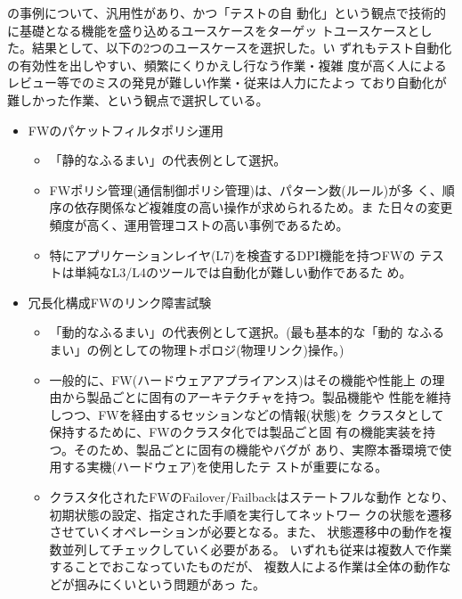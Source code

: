 の事例について、汎用性があり、かつ「テストの自
動化」という観点で技術的に基礎となる機能を盛り込めるユースケースをターゲッ
トユースケースとした。結果として、以下の2つのユースケースを選択した。い
ずれもテスト自動化の有効性を出しやすい、頻繁にくりかえし行なう作業・複雑
度が高く人によるレビュー等でのミスの発見が難しい作業・従来は人力にたよっ
ており自動化が難しかった作業、という観点で選択している。
\begin{itemize}
 \item FWのパケットフィルタポリシ運用
       \begin{itemize}
        \item 「静的なふるまい」の代表例として選択。
        \item FWポリシ管理(通信制御ポリシ管理)は、パターン数(ルール)が多
              く、順序の依存関係など複雑度の高い操作が求められるため。ま
              た日々の変更頻度が高く、運用管理コストの高い事例であるため。
        \item 特にアプリケーションレイヤ(L7)を検査するDPI機能を持つFWの
              テストは単純なL3/L4のツールでは自動化が難しい動作であるた
              め。
       \end{itemize}
 \item 冗長化構成FWのリンク障害試験
       \begin{itemize}
        \item 「動的なふるまい」の代表例として選択。(最も基本的な「動的
              なふるまい」の例としての物理トポロジ(物理リンク)操作。)
        \item 一般的に、FW(ハードウェアアプライアンス)はその機能や性能上
              の理由から製品ごとに固有のアーキテクチャを持つ。製品機能や
              性能を維持しつつ、FWを経由するセッションなどの情報(状態)を
              クラスタとして保持するために、FWのクラスタ化では製品ごと固
              有の機能実装を持つ。そのため、製品ごとに固有の機能やバグが
              あり、実際本番環境で使用する実機(ハードウェア)を使用したテ
              ストが重要になる。
        \item クラスタ化されたFWのFailover/Failbackはステートフルな動作
              となり、初期状態の設定、指定された手順を実行してネットワー
              クの状態を遷移させていくオペレーションが必要となる。また、
              状態遷移中の動作を複数並列してチェックしていく必要がある。
              いずれも従来は複数人で作業することでおこなっていたものだが、
              複数人による作業は全体の動作などが掴みにくいという問題があっ
              た。
       \end{itemize}
\end{itemize}

